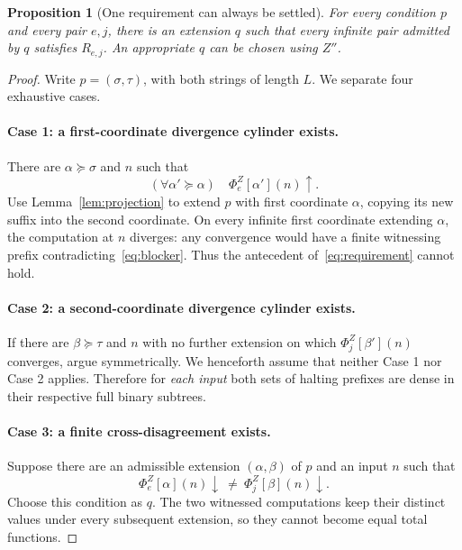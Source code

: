\documentclass[11pt,a4paper]{article}
\newcommand{\phiZ}[2]{\Phi_{#1}^{Z}[#2]}
\newtheorem{proposition}[theorem]{Proposition}
\theoremstyle{definition}\newtheorem{definition}[theorem]{Definition}
\theoremstyle{remark}\newtheorem{remark}[theorem]{Remark}
\begin{document}
\begin{proposition}[One requirement can always be settled]
\label{prop:extension}
For every condition $p$ and every pair $e,j$, there is an extension $q$ such that every infinite pair admitted by $q$ satisfies $R_{e,j}$. An appropriate $q$ can be chosen using $Z''$.
\end{proposition}
\begin{proof}
Write $p=(\sigma,\tau)$, with both strings of length $L$. We separate four exhaustive cases.

\paragraph{Case 1: a first-coordinate divergence cylinder exists.}
There are $\alpha\succeq\sigma$ and $n$ such that
\begin{equation}\label{eq:blocker}
    (\forall\alpha'\succeq\alpha)\quad
                  \phiZ{e}{\alpha'}(n)\uparrow.
\end{equation}
Use Lemma~\ref{lem:projection} to extend $p$ with first coordinate $\alpha$, copying its new suffix into the second coordinate. On every infinite first coordinate extending $\alpha$, the computation at $n$ diverges: any convergence would have a finite witnessing prefix contradicting~\eqref{eq:blocker}. Thus the antecedent of~\eqref{eq:requirement} cannot hold.

\paragraph{Case 2: a second-coordinate divergence cylinder exists.}
If there are $\beta\succeq\tau$ and $n$ with no further extension on which $\phiZ{j}{\beta'}(n)$ converges, argue symmetrically. We henceforth assume that neither Case 1 nor Case 2 applies. Therefore for \emph{each input} both sets of halting prefixes are dense in their respective full binary subtrees.

\paragraph{Case 3: a finite cross-disagreement exists.}
Suppose there are an admissible extension $(\alpha,\beta)$ of $p$ and an input $n$ such that
\begin{equation}\label{eq:crosssplit}
  \phiZ{e}{\alpha}(n)\downarrow\ \ne\
                            \phiZ{j}{\beta}(n)\downarrow.
\end{equation}
Choose this condition as $q$. The two witnessed computations keep their distinct values under every subsequent extension, so they cannot become equal total functions.


\end{proof}
\end{document}
